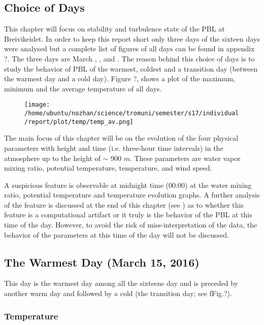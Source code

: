 \documentclass[a4paper,12pt]{article}
\numberwithin{equation}{section} %
\begin{document}
\subsection{Choice of Days}
This chapter will focus on stability and turbulence state of the PBL at Breivikeidet. In order to keep this report short only three days of the sixteen days were analysed but a complete list of figures of all days can be found in appendix ?. The three days are March , , and . The reason behind this choice of days is to study the behavior of PBL of the warmest, coldest and a transition day (between the warmest day and a cold day). Figure ?, shows a plot of the maximum, minimum and the average temperature of all days.

\begin{figure}[H]
	\texttt{[image: /home/ubuntu/nozhan/science/tromuni/semester/s17/individual/report/plot/temp/temp\_av.png]}
\end{figure}

The main focus of this chapter will be on the evolution of the four physical parameters with height and time (i.e. three-hour time intervals) in the atmosphere up to the height of $\sim$ 900 $m$. These parameters are water vapor mixing ratio, potential temperature, temperature, and wind speed.

A suspicious feature is observable at midnight time (00:00) at the water mixing ratio, potential temperature and temperature evolution graphs. A further analysis of the feature is discussed at the end of this chapter (see ) as to whether this feature is a computational artifact or it truly is the behavior of the PBL at this time of the day. However, to avoid the risk of miss-interpretation of the data, the behavior of the parameters at this time of the day will not be discussed.

\subsection{The Warmest Day (March 15, 2016)}

This day is the warmest day among all the sixteens day and is preceded by another warm day and followed by a cold (the transition day; see fFig.?).

\subsubsection{Temperature}
\end{document}
